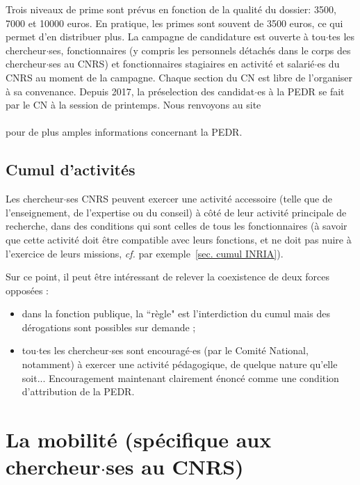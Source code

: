 Trois niveaux de prime sont pr\'evus en fonction de la qualit\'e du dossier: 3500, 7000 et 10000 euros. En pratique, les primes sont souvent de 3500 euros, ce qui permet d'en distribuer plus. 
La campagne de candidature est ouverte \`a tou$\cdot$tes les chercheur$\cdot$ses, fonctionnaires (y compris les personnels
d\'etach\'es dans le corps des chercheur$\cdot$ses au CNRS) et fonctionnaires stagiaires en activit\'e et salari\'e$\cdot$es
 du CNRS au moment de la campagne. Chaque section du CN est libre
de l'organiser \`a sa convenance. Depuis 2017, la pr\'eselection des candidat$\cdot$es \`a la PEDR se fait par le CN \`a la session de printemps. Nous renvoyons au site\\
\\
pour de plus amples informations concernant la PEDR.



\subsection{Cumul d'activit\'es}
\label{sec. cumul CNRS}

Les chercheur$\cdot$ses CNRS peuvent exercer une activit\'e accessoire (telle
que de l'enseignement, de l'expertise ou du conseil) \`a c\^ot\'e de
leur activit\'e principale de recherche, dans des conditions qui sont celles de tous les fonctionnaires (\`a savoir que cette activit\'e doit
\^etre compatible avec leurs fonctions, et ne doit pas nuire \`a
l'exercice de leurs missions, {\em cf.} par exemple~\ref{sec. cumul INRIA}).

Sur ce point, il peut \^etre int\'eressant de relever la coexistence de deux forces oppos\'ees :
\begin{itemize}
\item dans la fonction publique, la ``r\`egle" est l'interdiction du cumul mais des d\'erogations
sont possibles sur demande ;
\item tou$\cdot$tes les chercheur$\cdot$ses sont encourag\'e$\cdot$es (par le Comit\'e National, notamment) \`a exercer
 une activit\'e p\'edago\-gique, de quelque nature qu'elle soit... Encouragement maintenant
clairement \'enonc\'e comme une condition d'attribution de la PEDR.
\end{itemize}


\section{La mobilit\'e (sp\'ecifique aux chercheur$\cdot$ses au CNRS)}

